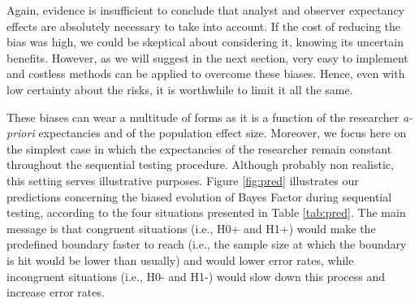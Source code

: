 \documentclass[a4paper,man,natbib,floatsintext,donotrepeattitle]{apa6}
\begin{document}
\vspace{5mm}

\begin{table}[H]
\centering
\caption{Possible interactions between population effect size and a priori beliefs during a sequential testing procedure. Congruent observations are expected to increase the speed of threshold reaching (H0+ and H1+), while incongruent observations are expected to slow down the process (H0- and H1-), and to increase the number of false alarms.}
\label{tab:pred}
\end{table}

Again, evidence is insufficient to conclude that analyst and observer expectancy effects are absolutely necessary to take into account. If the cost of reducing the bias was high, we could be skeptical about considering it, knowing its uncertain benefits. However, as we will suggest in the next section, very easy to implement and costless methods can be applied to overcome these biases. Hence, even with low certainty about the risks, it is worthwhile to limit it all the same. \par


These biases can wear a multitude of forms as it is a function of the researcher \textit{a-priori} expectancies and of the population effect size. Moreover, we focus here on the simplest case in which the expectancies of the researcher remain constant throughout the sequential testing procedure. Although probably non realistic, this setting serves illustrative purposes. Figure \ref{fig:pred} illustrates our predictions concerning the biased evolution of Bayes Factor during sequential testing, according to the four situations presented in Table \ref{tab:pred}. The main message is that congruent situations (i.e., H0+ and H1+) would make the predefined boundary faster to reach (i.e., the sample size at which the boundary is hit would be lower than usually) and would lower error rates, while incongruent situations (i.e., H0- and H1-) would slow down this process and increase error rates.
\end{document}
